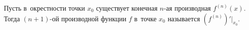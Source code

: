\label{nna}
    Пусть в~окрестности точки $x_0$ существует конечная $n$-ая производная $f^{(n)}(x)$. Тогда $(n+1)$-ой производной функции $f$ в~точке $x_0$
    называется $(f^{(n)})'\big|_{x_0}$.
